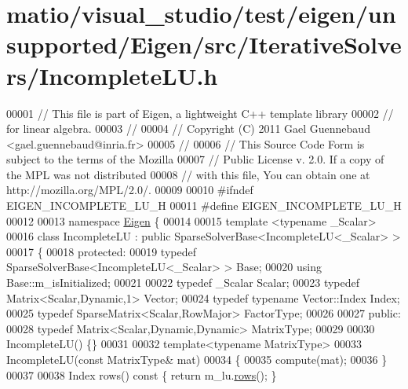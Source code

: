 \hypertarget{matio_2visual__studio_2test_2eigen_2unsupported_2_eigen_2src_2_iterative_solvers_2_incomplete_l_u_8h_source}{}\section{matio/visual\+\_\+studio/test/eigen/unsupported/\+Eigen/src/\+Iterative\+Solvers/\+Incomplete\+LU.h}
\label{matio_2visual__studio_2test_2eigen_2unsupported_2_eigen_2src_2_iterative_solvers_2_incomplete_l_u_8h_source}

\begin{DoxyCode}
00001 \textcolor{comment}{// This file is part of Eigen, a lightweight C++ template library}
00002 \textcolor{comment}{// for linear algebra.}
00003 \textcolor{comment}{//}
00004 \textcolor{comment}{// Copyright (C) 2011 Gael Guennebaud <gael.guennebaud@inria.fr>}
00005 \textcolor{comment}{//}
00006 \textcolor{comment}{// This Source Code Form is subject to the terms of the Mozilla}
00007 \textcolor{comment}{// Public License v. 2.0. If a copy of the MPL was not distributed}
00008 \textcolor{comment}{// with this file, You can obtain one at http://mozilla.org/MPL/2.0/.}
00009 
00010 \textcolor{preprocessor}{#ifndef EIGEN\_INCOMPLETE\_LU\_H}
00011 \textcolor{preprocessor}{#define EIGEN\_INCOMPLETE\_LU\_H}
00012 
00013 \textcolor{keyword}{namespace }\hyperlink{namespace_eigen}{Eigen} \{ 
00014 
00015 \textcolor{keyword}{template} <\textcolor{keyword}{typename} \_Scalar>
00016 \textcolor{keyword}{class }IncompleteLU : \textcolor{keyword}{public} SparseSolverBase<IncompleteLU<\_Scalar> >
00017 \{
00018   \textcolor{keyword}{protected}:
00019     \textcolor{keyword}{typedef} SparseSolverBase<IncompleteLU<\_Scalar> > Base;
00020     \textcolor{keyword}{using} Base::m\_isInitialized;
00021     
00022     \textcolor{keyword}{typedef} \_Scalar Scalar;
00023     \textcolor{keyword}{typedef} Matrix<Scalar,Dynamic,1> Vector;
00024     \textcolor{keyword}{typedef} \textcolor{keyword}{typename} Vector::Index Index;
00025     \textcolor{keyword}{typedef} SparseMatrix<Scalar,RowMajor> FactorType;
00026 
00027   \textcolor{keyword}{public}:
00028     \textcolor{keyword}{typedef} Matrix<Scalar,Dynamic,Dynamic> MatrixType;
00029 
00030     IncompleteLU() \{\}
00031 
00032     \textcolor{keyword}{template}<\textcolor{keyword}{typename} MatrixType>
00033     IncompleteLU(\textcolor{keyword}{const} MatrixType& mat)
00034     \{
00035       compute(mat);
00036     \}
00037 
00038     Index rows()\textcolor{keyword}{ const }\{ \textcolor{keywordflow}{return} m\_lu.\hyperlink{group___sparse_core___module_a62e61bb861eee306d5b069ce652b5aa5}{rows}(); \}

\end{DoxyCode}
